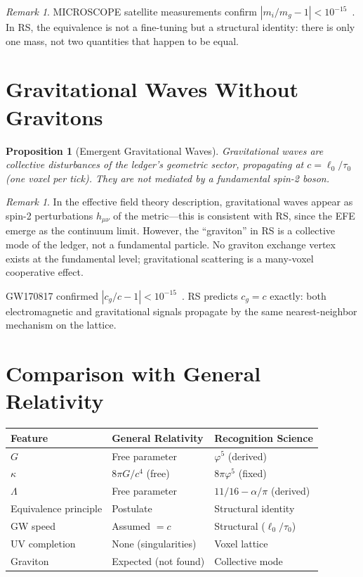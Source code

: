 \documentclass[12pt,a4paper]{article}
\newtheorem{proposition}[theorem]{Proposition}
\theoremstyle{definition}
\theoremstyle{remark}
\newtheorem{remark}[theorem]{Remark}
\begin{document}
\begin{remark}
MICROSCOPE satellite measurements confirm
$|m_i/m_g - 1| < 10^{-15}$~\cite{MICROSCOPE}.  In RS,
the equivalence is not a fine-tuning but a structural
identity: there is only one mass, not two quantities that
happen to be equal.
\end{remark}

\section{Gravitational Waves Without Gravitons}
\label{sec:no-graviton}

\begin{proposition}[Emergent Gravitational Waves]
\label{prop:gw}
Gravitational waves are collective disturbances of the
ledger's geometric sector, propagating at
$c = \ell_0/\tau_0$ (one voxel per tick).  They are not
mediated by a fundamental spin-2 boson.
\end{proposition}

\begin{remark}
In the effective field theory description, gravitational
waves appear as spin-2 perturbations $h_{\mu\nu}$ of the
metric---this is consistent with RS, since the EFE emerge
as the continuum limit.  However, the ``graviton'' in RS
is a collective mode of the ledger, not a fundamental
particle.  No graviton exchange vertex exists at the
fundamental level; gravitational scattering is a
many-voxel cooperative effect.

GW170817 confirmed $|c_g/c - 1| < 10^{-15}$~\cite{GW170817}.
RS predicts $c_g = c$ exactly: both electromagnetic and
gravitational signals propagate by the same nearest-neighbor
mechanism on the lattice.
\end{remark}

\section{Comparison with General Relativity}
\label{sec:comparison}

\begin{center}
\renewcommand{\arraystretch}{1.3}
\begin{tabular}{p{3.2cm}p{5cm}p{5.5cm}}
\toprule
\textbf{Feature} & \textbf{General Relativity}
  & \textbf{Recognition Science} \\
\midrule
$G$ & Free parameter & $\varphi^5$ (derived) \\
$\kappa$ & $8\pi G/c^4$ (free) & $8\pi\varphi^5$ (fixed) \\
$\Lambda$ & Free parameter & $11/16 - \alpha/\pi$ (derived) \\
Equivalence principle & Postulate & Structural identity \\
GW speed & Assumed $= c$ & Structural ($\ell_0/\tau_0$) \\
UV completion & None (singularities) & Voxel lattice \\
Graviton & Expected (not found) & Collective mode \\
\bottomrule
\end{tabular}
\end{center}
\end{document}
